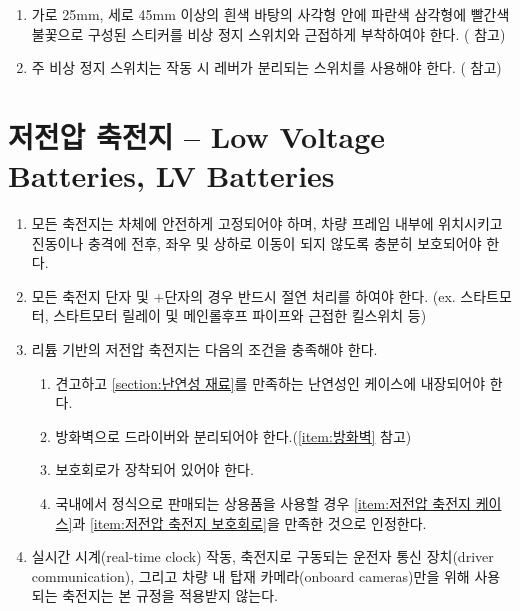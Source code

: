 \documentclass[final,a4paper,10pt]{report}
\begin{document}
\begin{enumerate}
  \item\label{rule:formula-technical.emergency-stop-switch.warning-sticker-dimensions} 가로 25mm, 세로 45mm 이상의 흰색 바탕의 사각형 안에 파란색 삼각형에 빨간색 불꽃으로 구성된 스티커를 비상 정지 스위치와 근접하게 부착하여야 한다. ( 참고)
  \item\label{rule:formula-technical.emergency-stop-switch.detachable-lever-type} 주 비상 정지 스위치는 작동 시 레버가 분리되는 스위치를 사용해야 한다. ( 참고)

\end{enumerate}

\section{저전압 축전지 – Low Voltage Batteries, LV Batteries}\label{rule:formula-technical.low-voltage-batteries} \label{section:저전압 축전지}
\begin{enumerate}
  \item\label{rule:formula-technical.low-voltage-batteries.secure-mounting-within-frame} 모든 축전지는 차체에 안전하게 고정되어야 하며, 차량 프레임 내부에 위치시키고 진동이나 충격에 전후, 좌우 및 상하로 이동이 되지 않도록 충분히 보호되어야 한다.
  \item\label{rule:formula-technical.low-voltage-batteries.terminal-insulation} 모든 축전지 단자 및 +단자의 경우 반드시 절연 처리를 하여야 한다. (ex. 스타트모터, 스타트모터 릴레이 및 메인롤후프 파이프와 근접한 킬스위치 등)
  \item\label{rule:formula-technical.low-voltage-batteries.lithium-battery-conditions} 리튬 기반의 저전압 축전지는 다음의 조건을 충족해야 한다.
    \begin{enumerate}
      \item\label{rule:formula-technical.low-voltage-batteries.lithium-battery-conditions.rigid-flame-retardant-case} 견고하고 \ref{section:난연성 재료}를 만족하는 난연성인 케이스에 내장되어야 한다. \label{item:저전압 축전지 케이스}
      \item\label{rule:formula-technical.low-voltage-batteries.lithium-battery-conditions.firewall-separation} 방화벽으로 드라이버와 분리되어야 한다.(\ref{item:방화벽} 참고)
      \item\label{rule:formula-technical.low-voltage-batteries.lithium-battery-conditions.protection-circuit} 보호회로가 장착되어 있어야 한다. \label{item:저전압 축전지 보호회로}
      \item\label{rule:formula-technical.low-voltage-batteries.lithium-battery-conditions.commercial-product-compliance} 국내에서 정식으로 판매되는 상용품을 사용할 경우 \ref{item:저전압 축전지 케이스}과 \ref{item:저전압 축전지 보호회로}을 만족한 것으로 인정한다.
    \end{enumerate}
  \item\label{rule:formula-technical.low-voltage-batteries.rtc-comm-camera-exemption} {\color{blue} 실시간 시계(real-time clock) 작동, 축전지로 구동되는 운전자 통신 장치(driver communication), 그리고 차량 내 탑재 카메라(onboard cameras)만을 위해 사용되는 축전지는 본 규정을 적용받지 않는다.}
\end{enumerate}
\end{document}
